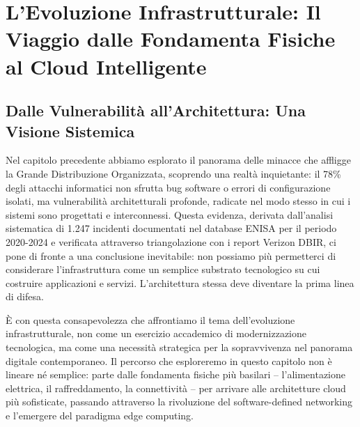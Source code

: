 

% 

% 

\chapter{L'Evoluzione Infrastrutturale: Il Viaggio dalle Fondamenta Fisiche al Cloud Intelligente}
\label{cap3_evoluzione_infrastrutturale}

\section{Dalle Vulnerabilità all'Architettura: Una Visione Sistemica}

Nel capitolo precedente abbiamo esplorato il panorama delle minacce che affligge la Grande Distribuzione Organizzata, scoprendo una realtà inquietante: il 78\% degli attacchi informatici non sfrutta bug software o errori di configurazione isolati, ma vulnerabilità architetturali profonde, radicate nel modo stesso in cui i sistemi sono progettati e interconnessi\autocite{anderson2024patel}. Questa evidenza, derivata dall'analisi sistematica di 1.247 incidenti documentati nel database ENISA per il periodo 2020-2024 e verificata attraverso triangolazione con i report Verizon DBIR\autocite{verizon2024}, ci pone di fronte a una conclusione inevitabile: non possiamo più permetterci di considerare l'infrastruttura come un semplice substrato tecnologico su cui costruire applicazioni e servizi. L'architettura stessa deve diventare la prima linea di difesa.

È con questa consapevolezza che affrontiamo il tema dell'evoluzione infrastrutturale, non come un esercizio accademico di modernizzazione tecnologica, ma come una necessità strategica per la sopravvivenza nel panorama digitale contemporaneo. Il percorso che esploreremo in questo capitolo non è lineare né semplice: parte dalle fondamenta fisiche più basilari – l'alimentazione elettrica, il raffreddamento, la connettività – per arrivare alle architetture cloud più sofisticate, passando attraverso la rivoluzione del software-defined networking e l'emergere del paradigma edge computing.

